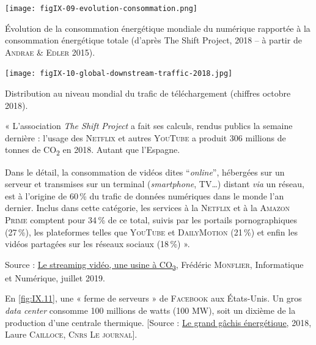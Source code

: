 \vspace{4pt}
\begin{jazzfigure*}
\centering
\texttt{[image: figIX-09-evolution-consommation.png]}
\caption{\label{fig:IX.9}Évolution de la consommation énergétique mondiale du numérique rapportée à la con\-sommation énergétique totale (d'après The Shift Project, 2018 -- à partir de \textsc{Andrae} \& \textsc{Edler} 2015).}
\end{jazzfigure*}

\pagebreak

\begin{jazzfigure}
\centering
\texttt{[image: figIX-10-global-downstream-traffic-2018.jpg]}
\caption{\label{fig:IX.10}Distribution au niveau mondial du trafic de téléchargement (chiffres octobre 2018).}
\end{jazzfigure}



« L'association \textit{The Shift Project} a fait ses calculs, rendus publics la semaine dernière : l'usage des \textsc{Netflix} et autres \textsc{YouTube} a produit 306 millions de tonnes de CO\textsubscript{2} en 2018. Autant que l'Espagne.

Dans le détail, la consommation de vidéos dites “\textit{online}”, hébergées sur un serveur et transmises sur un terminal (\textit{smartphone}, TV…) distant \textit{via} un réseau, est à l’origine de 60\,\% du trafic de données numériques dans le monde l’an dernier. Inclus dans cette catégorie, les services à la \textsc{Netflix} et à la \textsc{Amazon Prime} comptent pour 34\,\% de ce total, suivis par les portails pornographiques (27\,\%), les plateformes telles que \textsc{YouTube} et \textsc{DailyMotion} (21\,\%) et enfin les vidéos partagées sur les réseaux sociaux (18\,\%) ».

\noindent Source : \href{https://www.techniques-ingenieur.fr/actualite/articles/le-streaming-video-une-usine-a-co2-68488/}{Le streaming vidéo, une usine à CO\textsubscript{2}}, Frédéric \textsc{Monflier}, Informatique et Numérique, juillet 2019.




En \cref{fig:IX.11}, une « ferme de serveurs » de \textsc{Facebook} aux États-Unis. Un gros \textit{data center} consomme 100 millions de watts (100 MW), soit un dixième de la production d’une centrale thermique. [Source : \href{https://lejournal.cnrs.fr/articles/numerique-le-grand-gachis-energetique}{Le grand gâchis énergétique}, 2018, Laure \textsc{Cailloce}, \textsc{Cnrs Le journal}].



